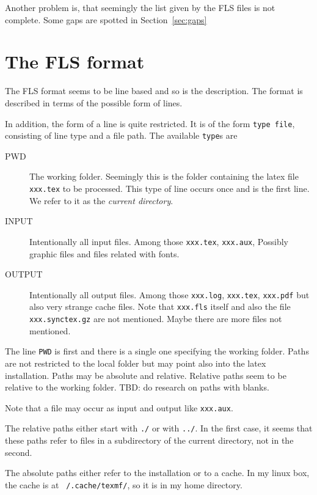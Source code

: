 \documentclass[a4paper, english]{article}%
\begin{document}
Another problem is, that seemingly the list given by the FLS files 
is not complete. 
Some gaps are spotted in Section~\ref{sec:gaps}


\section{The FLS format}\label{sec:format}

The FLS format seems to be line based and so is the description. 
The format is described in terms of the possible form of lines. 

In addition, the form of a line is quite restricted. 
It is of the form \texttt{type file}, consisting of line type and a file path. 
The available \texttt{type}s are 
%
\begin{description}
  \item[PWD] The working folder. 
  Seemingly this is the folder containing the latex file \texttt{xxx.tex} to be processed. 
  This type of line occurs once and is the first line. 
  We refer to it as the \emph{current directory}. 
  \item[INPUT] Intentionally all input files. Among those \texttt{xxx.tex}, \texttt{xxx.aux}, 
  Possibly graphic files and files related with fonts. 
  \item[OUTPUT] Intentionally all output files. 
  Among those \texttt{xxx.log}, \texttt{xxx.tex}, \texttt{xxx.pdf}
  but also very strange cache files. 
  Note that \texttt{xxx.fls} itself and also the file \texttt{xxx.synctex.gz} are not mentioned. 
  Maybe there are more files not mentioned. 
\end{description}

The line \texttt{PWD} is first and there is a single one specifying the working folder. 
Paths are not restricted to the local folder but may point also into the latex installation. 
Paths may be absolute and relative. 
Relative paths seem to be relative to the working folder. 
TBD\@: do research on paths with blanks. 

Note that a file may occur as input and output like \texttt{xxx.aux}. 

The relative paths either start with \texttt{./} or with \texttt{../}. 
In the first case, it seems that these paths refer to files in a subdirectory 
of the current directory, not in the second. 

The absolute paths either refer to the installation or to a cache. 
In my linux box, the cache is at \texttt{~/.cache/texmf/}, so it is in my home directory. 
\end{document}
